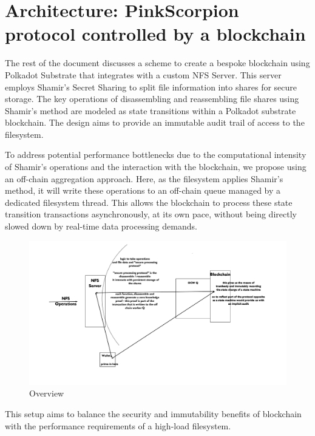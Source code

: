\documentclass{tufte-handout}
\begin{document}
\newpage
\section{Architecture: PinkScorpion protocol controlled by a blockchain}\label{sec:page-layout}
The rest of the document discusses a scheme to create a bespoke blockchain using Polkadot Substrate that integrates with a custom NFS Server. This server employs Shamir's
Secret Sharing to split file information into shares for secure storage. The key operations of disassembling and reassembling file shares using Shamir's method are
modeled as state transitions within a Polkadot substrate blockchain. The design aims to provide an immutable audit trail of access to the filesystem.

To address potential performance bottlenecks due to the computational intensity of Shamir's operations and the interaction with the blockchain, we propose using an
off-chain aggregation approach. Here, as the filesystem applies Shamir's method, it will write these operations to an off-chain queue managed by a dedicated filesystem
thread. This allows the blockchain to process these state transition transactions asynchronously, at its own pace, without being directly slowed down by real-time data
processing demands.

\begin{figure}[ht]
    \centering
    \includegraphics[width=1.2\textwidth]{NFS-polkadot-architecture.jpg}
    \caption{Overview}
    \label{fig:image1}
\end{figure}

This setup aims to balance the security and immutability benefits of blockchain with the performance requirements of a high-load filesystem.
\end{document}
